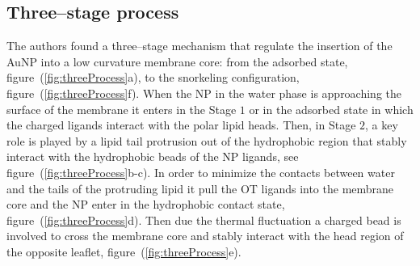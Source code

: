 \subsection{Three--stage process}
The authors found a three--stage mechanism that regulate the insertion of the \ac{AuNP} into a low curvature membrane core: from the adsorbed state, figure~(\ref{fig:threeProcess}a), to the snorkeling configuration, figure~(\ref{fig:threeProcess}f). When the \ac{NP} in the water phase is approaching the surface of the membrane it enters in the Stage $1$ or in the adsorbed state in which the charged ligands interact with the polar lipid heads. Then, in Stage $2$, a key role is played by a lipid tail protrusion out of the hydrophobic region that stably interact with the hydrophobic beads of the \ac{NP} ligands, see figure~(\ref{fig:threeProcess}b-c). In order to minimize the contacts between water and the tails of the protruding lipid it pull the \ac{OT} ligands into the membrane core and the \ac{NP} enter in the hydrophobic contact state, figure~(\ref{fig:threeProcess}d). Then due the thermal fluctuation a charged bead is involved to cross the membrane core and stably interact with the head region of the opposite leaflet, figure~(\ref{fig:threeProcess}e).
